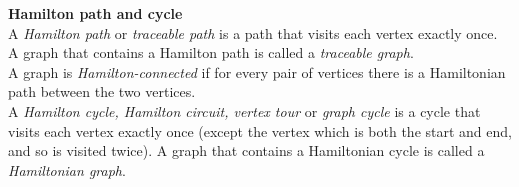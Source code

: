 \documentclass[12pt]{report}
\begin{document}
{\bf Hamilton path and cycle}\\
A {\em Hamilton path} or {\em traceable path} is a path that visits each vertex exactly once.\\
A graph that contains a Hamilton path is called a {\em traceable graph}.\\
A graph is {\em Hamilton-connected} if for every pair of vertices there is a Hamiltonian path between the two vertices.\\
A {\em Hamilton cycle, Hamilton circuit, vertex tour} or {\em graph cycle} is a cycle that visits each vertex exactly once (except the vertex which is both the start and end, and so is visited twice). A graph that contains a Hamiltonian cycle is called a {\em Hamiltonian graph}.\\
\end{document}
